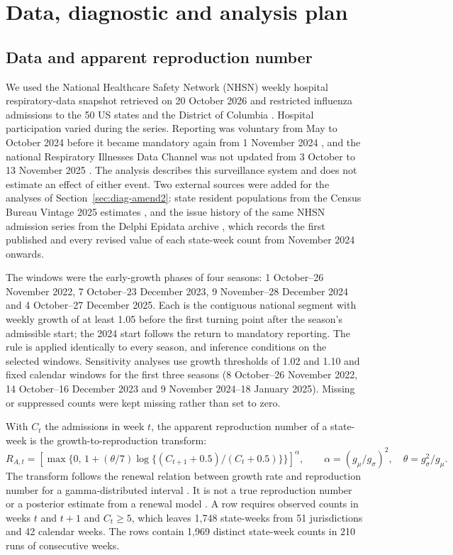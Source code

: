 \section{Data, diagnostic and analysis plan}
\label{sec:diagnostics}

\subsection{Data and apparent reproduction number}
\label{sec:diag-data}

We used the National Healthcare Safety Network (NHSN) weekly hospital respiratory-data snapshot retrieved on 20 October 2026 and restricted influenza admissions to the 50 US states and the District of Columbia \citep{cdc2026nhsn, frutos2025evaluation}. Hospital participation varied during the series. Reporting was voluntary from May to October 2024 before it became mandatory again from 1 November 2024 \citep{cms2024reporting}, and the national Respiratory Illnesses Data Channel was not updated from 3 October to 13 November 2025 \citep{cdc2026datachannel}. The analysis describes this surveillance system and does not estimate an effect of either event. Two external sources were added for the analyses of Section~\ref{sec:diag-amend2}: state resident populations from the Census Bureau Vintage 2025 estimates \citep{census2026popest}, and the issue history of the same NHSN admission series from the Delphi Epidata archive \citep{reinhart2021open}, which records the first published and every revised value of each state-week count from November 2024 onwards.

The windows were the early-growth phases of four seasons: 1 October--26 November 2022, 7 October--23 December 2023, 9 November--28 December 2024 and 4 October--27 December 2025. Each is the contiguous national segment with weekly growth of at least 1.05 before the first turning point after the season's admissible start; the 2024 start follows the return to mandatory reporting. The rule is applied identically to every season, and inference conditions on the selected windows. Sensitivity analyses use growth thresholds of 1.02 and 1.10 and fixed calendar windows for the first three seasons (8 October--26 November 2022, 14 October--16 December 2023 and 9 November 2024--18 January 2025). Missing or suppressed counts were kept missing rather than set to zero.

With $C_t$ the admissions in week $t$, the apparent reproduction number of a state-week is the growth-to-reproduction transform:
\begin{equation}
R_{A,t}=[\max\{0,\,1+(\theta/7)\log\{(C_{t+1}+0.5)/(C_t+0.5)\}\}]^{\alpha},\qquad
\alpha=(g_\mu/g_\sigma)^2,\quad\theta=g_\sigma^2/g_\mu.
\label{eq:ra}
\end{equation}
The transform follows the renewal relation between growth rate and reproduction number for a gamma-distributed interval \citep{wallinga2007how}. It is not a true reproduction number or a posterior estimate from a renewal model \citep{cori2013new, eales2024differences}. A row requires observed counts in weeks $t$ and $t+1$ and $C_t\ge5$, which leaves 1,748 state-weeks from 51 jurisdictions and 42 calendar weeks. The rows contain 1,969 distinct state-week counts in 210 runs of consecutive weeks.

